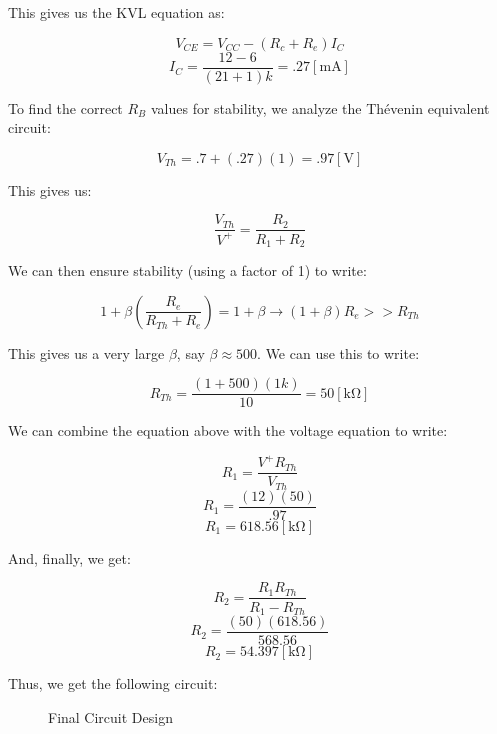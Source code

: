 \begin{enumerate}
    This gives us the KVL equation as:

    $$V_{CE}=V_{CC}-(R_c+R_e)I_C$$
    $$I_{C}=\frac{12-6}{(21+1)k}=.27[\si{\milli\ampere}]$$

    To find the correct $R_B$ values for stability, we analyze the Th\'evenin equivalent circuit:

    $$V_{Th}=.7+(.27)(1)=.97[\si{\volt}]$$

    This gives us:

    $$\frac{V_{Th}}{V^+}=\frac{R_2}{R_1+R_2}$$

    We can then ensure stability (using a factor of 1) to write:

    $$1+\beta\left( \frac{R_e}{R_{Th}+R_e} \right)=1+\beta\to (1+\beta)R_e>>R_{Th}$$

    This gives us a very large $\beta$, say $\beta\approx500$. We can use this to write:

    $$R_{Th}=\frac{(1+500)(1k)}{10}=50[\si{\kilo\ohm}]$$

    We can combine the equation above with the voltage equation to write:

    $$R_1=\frac{V^+R_{Th}}{V_{Th}}$$
    $$R_1=\frac{(12)(50)}{.97}$$
    $$R_1=618.56[\si{\kilo\ohm}]$$

    And, finally, we get:

    $$R_2=\frac{R_1R_{Th}}{R_1-R_{Th}}$$
    $$R_2=\frac{(50)(618.56)}{568.56}$$
    $$R_2=54.397[\si{\kilo\ohm}]$$

    Thus, we get the following circuit:

    \begin{figure}[H]
      \centering
      
      \caption{Final Circuit Design}
      \label{fig:4}
    \end{figure}

\end{enumerate}



